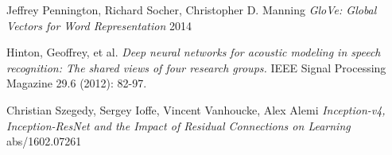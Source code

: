 \documentclass[12pt]{article}
\begin{document}
\begin{thebibliography}{1}
	 Jeffrey Pennington,   Richard Socher,   Christopher D. Manning  {\em GloVe: Global Vectors for Word Representation } 2014
	
 Hinton, Geoffrey, et al. {\em Deep neural networks for acoustic modeling in speech recognition: The shared views of four research groups.} IEEE Signal Processing Magazine 29.6 (2012): 82-97.


 Christian Szegedy, Sergey Ioffe, Vincent Vanhoucke, Alex Alemi {\em Inception-v4, Inception-ResNet and the Impact of Residual Connections on Learning} abs/1602.07261






	\end{thebibliography}
\end{document}

